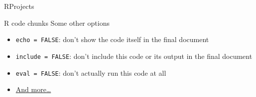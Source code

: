 \documentclass[
  ignorenonframetext,
]{beamer}
\providecommand{\tightlist}{%
  \setlength{\itemsep}{0pt}\setlength{\parskip}{0pt}}
\begin{document}
\begin{frame}[fragile]{RProjects}
\begin{block}{R code chunks}
Some other options

\begin{itemize}
\tightlist
\item
  \texttt{echo\ =\ FALSE}: don't show the code itself in the final
  document
\item
  \texttt{include\ =\ FALSE}: don't include this code or its output in
  the final document
\item
  \texttt{eval\ =\ FALSE}: don't actually run this code at all
\item
  \href{https://yihui.name/knitr/options/}{And more\ldots{}}
\end{itemize}

\end{block}

\end{frame}
\end{document}
